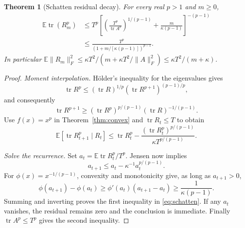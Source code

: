\documentclass[11pt,a4paper]{article}
\newtheorem{theorem}{Theorem}[section]
\theoremstyle{definition}\newtheorem{definition}[theorem]{Definition}
\theoremstyle{remark}\newtheorem{remark}[theorem]{Remark}
\numberwithin{equation}{section}
\newcommand{\E}{\mathbb E}
\newcommand{\tr}{\operatorname{tr}}
\newcommand{\norm}[1]{\lVert#1\rVert}
\begin{document}
\begin{theorem}[Schatten residual decay]\label{thm:schatten}
For every real $p>1$ and $m\ge0$,
\begin{equation}\label{eq:schatten}
\begin{aligned}
 \E\tr(R_m^p)
 &\le T^p\left[
 \left(\frac{T^p}{\tr A^p}\right)^{1/(p-1)}
 +\frac m{\kappa(p-1)}
 \right]^{-(p-1)}\\
 &\le\frac{T^p}{(1+m/[\kappa(p-1)])^{p-1}}.
\end{aligned}
\end{equation}
In particular
$\E\norm{R_m}_F^2\le\kappa T^2/(m+\kappa T^2/\norm A_F^2)\le\kappa T^2/(m+\kappa)$.
\end{theorem}
\begin{proof}
\emph{Moment interpolation.}
H\"older's inequality for the eigenvalues gives
\[
 \tr R^p\le(\tr R)^{1/p}(\tr R^{p+1})^{(p-1)/p},
\]
and consequently
\[
 \tr R^{p+1}
 \ge(\tr R^p)^{p/(p-1)}(\tr R)^{-1/(p-1)}.
\]
Use \(f(x)=x^p\) in Theorem~\ref{thm:convex} and \(\tr R_t\le T\) to obtain
\[
 \E[\tr R_{t+1}^p\mid R_t]
 \le\tr R_t^p
 -\frac{(\tr R_t^p)^{p/(p-1)}}{\kappa T^{p/(p-1)}}.
\]

\emph{Solve the recurrence.}
Set \(a_t=\E\tr R_t^p/T^p\). Jensen now implies
\[
 a_{t+1}\le a_t-\kappa^{-1}a_t^{p/(p-1)}.
\]
For \(\phi(x)=x^{-1/(p-1)}\), convexity and monotonicity give, as long
as \(a_{t+1}>0\),
\[
 \phi(a_{t+1})-\phi(a_t)
 \ge\phi'(a_t)(a_{t+1}-a_t)
 \ge\frac1{\kappa(p-1)}.
\]
Summing and inverting proves the first inequality in \eqref{eq:schatten}.
If any \(a_t\) vanishes, the residual remains zero and the conclusion
is immediate. Finally \(\tr A^p\le T^p\) gives the second inequality.
\end{proof}
\end{document}
